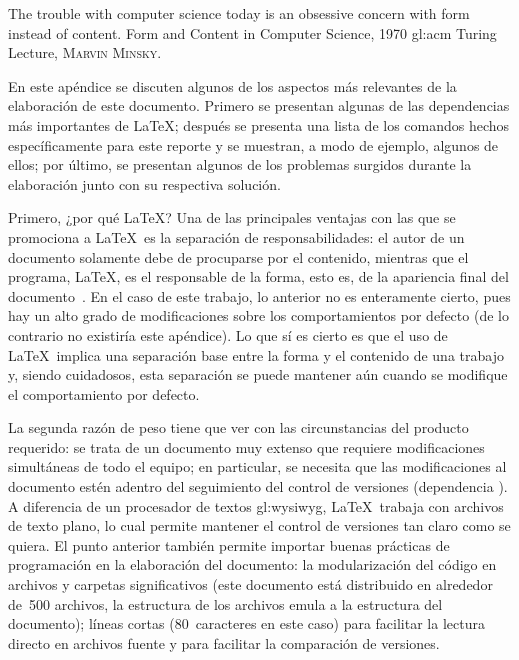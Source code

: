 %
%

{
  \epigrafe
  {%
    The trouble with computer science today is an obsessive concern with
    form instead of content.%
  }
  {%
    Form and Content in Computer Science, 1970 \acrshort{gl:acm} Turing Lecture,
    \textsc{Marvin Minsky}.%
  }
}

\noindent
En este apéndice se discuten algunos de los aspectos más relevantes de la
elaboración de este documento. Primero se presentan algunas de las dependencias
más importantes de \LaTeX; después se presenta una lista de los comandos hechos
específicamente para este reporte y se muestran, a modo de ejemplo, algunos de
ellos; por último, se presentan algunos de los problemas surgidos durante la
elaboración junto con su respectiva solución.

Primero, ¿por qué \LaTeX? Una de las principales ventajas con las que se
promociona a \LaTeX~es la separación de responsabilidades: el autor de un
documento solamente debe de procuparse por el contenido, mientras que el
programa, \LaTeX, es el responsable de la forma, esto es, de la apariencia
final del documento~\cite{introduccion_latex}. En el caso de este trabajo, lo
anterior no es enteramente cierto, pues hay un alto grado de modificaciones
sobre los comportamientos por defecto (de lo contrario no existiría este
apéndice). Lo que sí es cierto es que el uso de \LaTeX~implica una separación
base entre la forma y el contenido de una trabajo y, siendo cuidadosos, esta
separación se puede mantener aún cuando se modifique el comportamiento por
defecto.

La segunda razón de peso tiene que ver con las circunstancias del producto
requerido: se trata de un documento muy extenso que requiere modificaciones
simultáneas de todo el equipo; en particular, se necesita que las
modificaciones al documento estén adentro del seguimiento del control de
versiones (dependencia ). A diferencia de un procesador
de textos \gls{gl:wysiwyg}, \LaTeX~trabaja con archivos de texto plano, lo cual
permite mantener el control de versiones tan claro como se quiera. El punto
anterior también permite importar buenas prácticas de programación en la
elaboración del documento: la modularización del código en archivos y carpetas
significativos (este documento está distribuido en alrededor de~500 archivos,
la estructura de los archivos emula a la estructura del documento); líneas
cortas (80~caracteres en este caso) para facilitar la lectura directo en
archivos fuente y para facilitar la comparación de versiones.

